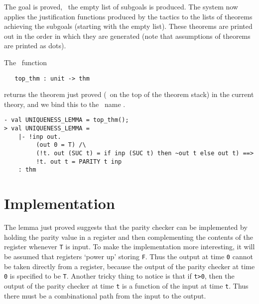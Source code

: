 \noindent The goal is proved, \ie\ the empty list of subgoals is produced.
The system now applies the justification functions produced by the
tactics to the lists of theorems achieving the subgoals (starting with
the empty list).  These theorems are printed out in the order in which
they are generated (note that assumptions of theorems are printed as
dots).

The \ML\ function

{\small\baselineskip\HOLSpacing\begin{verbatim}
   top_thm : unit -> thm
\end{verbatim}}

\noindent
returns the theorem just proved (\ie\ on the top of the theorem stack)
in the current theory, and we bind this to the \ML\ name
.

\begin{session}
\begin{verbatim}
- val UNIQUENESS_LEMMA = top_thm();
> val UNIQUENESS_LEMMA =
    |- !inp out.
         (out 0 = T) /\
         (!t. out (SUC t) = if inp (SUC t) then ~out t else out t) ==>
         !t. out t = PARITY t inp
    : thm
\end{verbatim}
\end{session}

\section{Implementation}
\label{implementation}

The lemma just proved suggests that the parity checker can be
implemented by holding the parity value in a register and then
complementing the contents of the register whenever {\small\verb|T|}
is input. To make the implementation more interesting, it will be
assumed that registers `power up' storing {\small\verb|F|}. Thus the
output at time {\small\verb|0|} cannot be taken directly from a
register, because the output of the parity checker at time
{\small\verb|0|} is specified to be {\small\verb|T|}. Another tricky
thing to notice is that if {\small\verb|t>0|}, then the output of the
parity checker at time {\small\verb|t|} is a function of the input at
time {\small\verb|t|}. Thus there must be a combinational path from
the input to the output.

